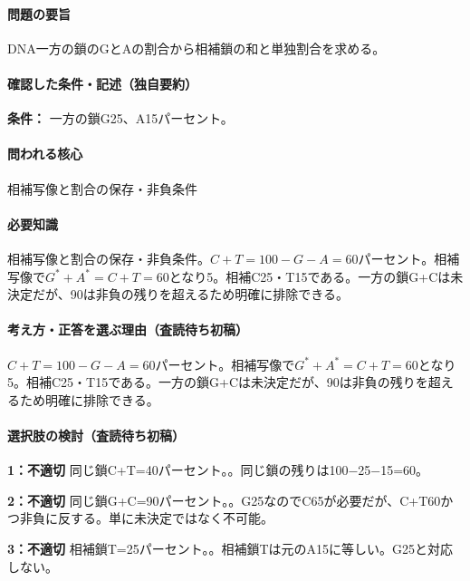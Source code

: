 \paragraph{問題の要旨} DNA一方の鎖のGとAの割合から相補鎖の和と単独割合を求める。

\paragraph{確認した条件・記述（独自要約）}\mbox{}\par

\noindent\textbf{条件：} 一方の鎖G25、A15パーセント。\par

\paragraph{問われる核心} 相補写像と割合の保存・非負条件

\paragraph{必要知識} 相補写像と割合の保存・非負条件。\(C+T=100-G-A=60\)パーセント。相補写像で\(G^{\ast}+A^{\ast}=C+T=60\)となり5。相補C25・T15である。一方の鎖G+Cは未決定だが、90は非負の残りを超えるため明確に排除できる。

\paragraph{考え方・正答を選ぶ理由（査読待ち初稿）} \(C+T=100-G-A=60\)パーセント。相補写像で\(G^{\ast}+A^{\ast}=C+T=60\)となり5。相補C25・T15である。一方の鎖G+Cは未決定だが、90は非負の残りを超えるため明確に排除できる。

\paragraph{選択肢の検討（査読待ち初稿）}\mbox{}\par

\noindent\textbf{1：不適切} 同じ鎖C+T=\allowbreak{}40パーセント。。同じ鎖の残りは100−25−15=\allowbreak{}60。\par

\noindent\textbf{2：不適切} 同じ鎖G+C=\allowbreak{}90パーセント。。G25なのでC65が必要だが、C+T60かつ非負に反する。単に未決定ではなく不可能。\par

\noindent\textbf{3：不適切} 相補鎖T=\allowbreak{}25パーセント。。相補鎖Tは元のA15に等しい。G25と対応しない。\par

